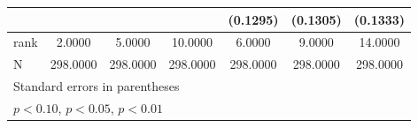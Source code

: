 {\begin{tabular}{l*{6}{c}}
                    &                     &                     &                     &    (0.1295)         &    (0.1305)         &    (0.1333)         \\
\midrule
rank                &      2.0000         &      5.0000         &     10.0000         &      6.0000         &      9.0000         &     14.0000         \\
N                   &    298.0000         &    298.0000         &    298.0000         &    298.0000         &    298.0000         &    298.0000         \\
\bottomrule
\multicolumn{7}{l}{\footnotesize Standard errors in parentheses}\\
\multicolumn{7}{l}{\footnotesize \sym{*} \(p<0.10\), \sym{**} \(p<0.05\), \sym{***} \(p<0.01\)}\\
\end{tabular}
}
